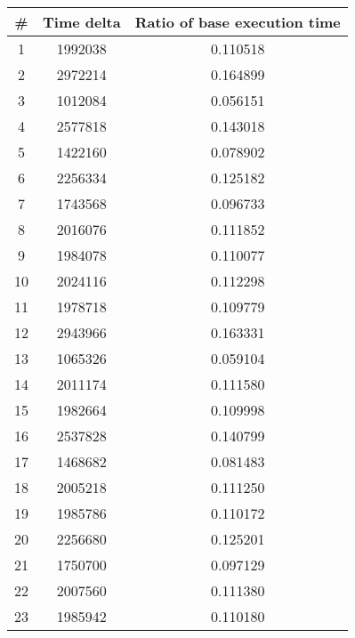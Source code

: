 \begin{tabular}{ccc}
\toprule
# & Time delta & Ratio of base execution time\\
\midrule
1 & 1992038 & 0.110518 \\
2 & 2972214 & 0.164899 \\
3 & 1012084 & 0.056151 \\
4 & 2577818 & 0.143018 \\
5 & 1422160 & 0.078902 \\
6 & 2256334 & 0.125182 \\
7 & 1743568 & 0.096733 \\
8 & 2016076 & 0.111852 \\
9 & 1984078 & 0.110077 \\
10 & 2024116 & 0.112298 \\
11 & 1978718 & 0.109779 \\
12 & 2943966 & 0.163331 \\
13 & 1065326 & 0.059104 \\
14 & 2011174 & 0.111580 \\
15 & 1982664 & 0.109998 \\
16 & 2537828 & 0.140799 \\
17 & 1468682 & 0.081483 \\
18 & 2005218 & 0.111250 \\
19 & 1985786 & 0.110172 \\
20 & 2256680 & 0.125201 \\
21 & 1750700 & 0.097129 \\
22 & 2007560 & 0.111380 \\
23 & 1985942 & 0.110180 \\
\bottomrule
\end{tabular}
